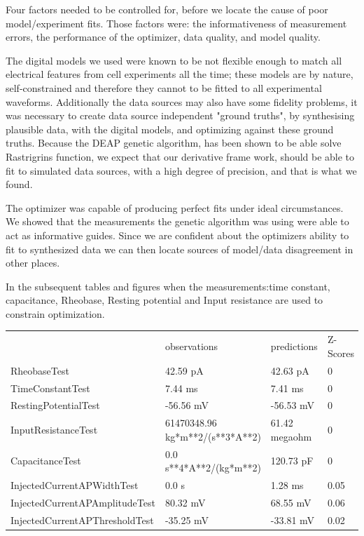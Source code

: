 




Four factors needed to be controlled for, before we locate the cause of poor model/experiment fits. Those factors were: the informativeness of measurement errors, the performance of the optimizer, data quality, and model quality.

The digital models we used were known to be not flexible enough to match all electrical features from cell experiments all the time; these models are by nature, self-constrained and therefore they cannot to be fitted to all experimental waveforms. Additionally the data sources may also have some fidelity problems, it was necessary to create data source independent "ground truths", by synthesising plausible data, with the digital models, and optimizing against these ground truths. Because the DEAP genetic algorithm, has been shown to be able solve Rastrigrins function, we expect that our derivative frame work, should be able to fit to simulated data sources, with a high degree of precision, and that is what we found.


The optimizer was capable of producing perfect fits under ideal circumstances. We showed that the measurements the genetic algorithm was using were able to act as informative guides. Since we are confident about the optimizers ability to fit to synthesized data we can then locate sources of model/data disagreement in other places.

In the subsequent tables and figures when the measurements:time constant, capacitance, Rheobase, Resting potential and Input resistance are used to constrain optimization. \\


\begin{tabular}{llll}
{} &                     observations &    predictions & Z-Scores \\
RheobaseTest                   &                         42.59 pA &       42.63 pA &        0 \\
TimeConstantTest               &                          7.44 ms &        7.41 ms &        0 \\
RestingPotentialTest           &                        -56.56 mV &      -56.53 mV &        0 \\
InputResistanceTest            &  61470348.96 kg*m**2/(s**3*A**2) &  61.42 megaohm &        0 \\
CapacitanceTest                &          0.0 s**4*A**2/(kg*m**2) &      120.73 pF &        0 \\
InjectedCurrentAPWidthTest     &                            0.0 s &        1.28 ms &     0.05 \\
InjectedCurrentAPAmplitudeTest &                         80.32 mV &       68.55 mV &     0.06 \\
InjectedCurrentAPThresholdTest &                        -35.25 mV &      -33.81 mV &     0.02 \\
\end{tabular}

